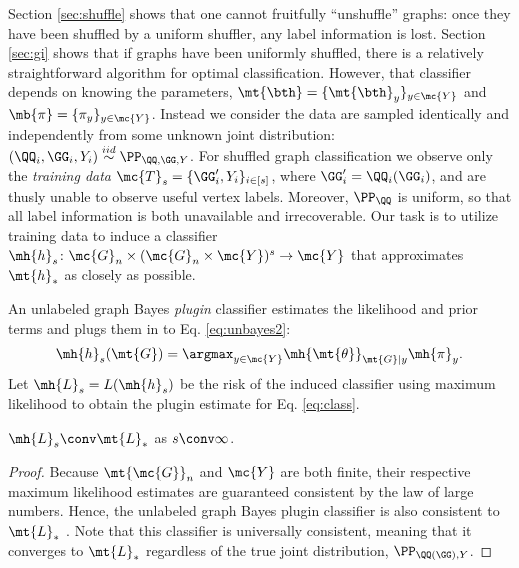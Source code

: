\documentclass[10pt,journal,cspaper,compsoc]{IEEEtran}
\begin{document}
Section \ref{sec:shuffle} shows that one cannot fruitfully ``unshuffle'' graphs: once they have been shuffled by a uniform shuffler, any label information is lost.  Section \ref{sec:gi} shows that if graphs have been uniformly shuffled, there is a relatively straightforward algorithm for optimal classification. However, that classifier depends on knowing the parameters, $\mt{\bth}=\{\mt{\bth}_y\}_{y\in \mc{Y}}$ and $\mb{\pi}=\{\pi_y\}_{y \in \mc{Y}}$. Instead we consider the data are sampled identically and independently from some unknown joint distribution: $(\QQ_i,\GG_i,Y_i)\overset{iid}{\sim}\PP_{\QQ,\GG,Y}$.  For shuffled graph classification we observe only the \emph{training data} $\mc{T}_s=\{\GG_i',Y_i\}_{i \in [s]}$, where $\GG_i'=\QQ_i(\GG_i)$, and are thusly unable to observe useful vertex labels.  Moreover, $\PP_{\QQ}$ is uniform, so that all label information is both unavailable and irrecoverable.  Our task is to utilize training data to induce a classifier $\mh{h}_s\colon \mc{G}_n \times (\mc{G}_n \times \mc{Y})^s \to \mc{Y}$ that approximates $\mt{h}_*$ as closely as possible.  

An unlabeled graph Bayes \emph{plugin} classifier estimates the likelihood and prior terms and plugs them in to Eq. \eqref{eq:unbayes2}:
\begin{align} \label{eq:class}
	\mh{h}_s(\mt{G})=\argmax_{y\in\mc{Y}} \mh{\mt{\theta}}_{\mt{G}|y}\mh{\pi}_y. %
\end{align}
Let $\mh{L}_s=L(\mh{h}_s)$ be the risk of the induced classifier using maximum likelihood to obtain the plugin estimate for Eq. \eqref{eq:class}. 

\begin{thm} \label{thm:4}
	$\mh{L}_s \conv \mt{L}_*$ as $s \conv \infty$.
\end{thm}

\begin{proof}
Because $\mt{\mc{G}}_n$ and $\mc{Y}$ are both finite, their respective maximum likelihood estimates are guaranteed consistent by the law of large numbers.  Hence,  the unlabeled graph Bayes plugin classifier is also consistent to $\mt{L}_*$ \cite{DEV96}. Note that this classifier is universally consistent, meaning that it converges to $\mt{L}_*$ regardless of the true joint distribution, $\PP_{\QQ(\GG) ,Y}$. %
\end{proof}
\end{document}
